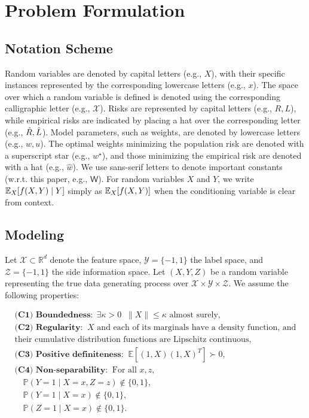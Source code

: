 


\section{Problem Formulation}

\subsection{Notation Scheme}



Random variables are denoted by capital letters (e.g., $X$), with their specific instances represented by the corresponding lowercase letters (e.g., $x$). The space over which a random variable is defined is denoted using the corresponding calligraphic letter (e.g., $\mathcal{X}$). Risks are represented by capital  letters (e.g., $R,L$), while empirical risks are indicated by placing a hat over the corresponding letter (e.g., $\hat{R}, \hat{L}$). Model parameters, such as weights, are denoted by lowercase  letters (e.g., $w,u$). The optimal weights minimizing the population risk are denoted with a superscript star (e.g., $w^\star$), and those minimizing the empirical risk are denoted with a hat (e.g., $\hat{w}$). We use sans-serif letters to denote important constants (w.r.t. this paper, e.g., $\mathsf{W}$). For random variables $X$ and $Y$, we write $\mathbb{E}_{X}[f(X,Y)\mid Y]$ simply as $\mathbb{E}_{X}[f(X,Y)]$ when the conditioning variable is clear from context.


\subsection{Modeling}
Let $\mathcal{X} \subset \mathbb{R}^d$ denote the feature space, $\mathcal{Y} = \{-1, 1\}$ the label space, and $\mathcal{Z} = \{-1, 1\}$ the side information space. Let $(X, Y, Z)$ be a random variable representing the true data generating process over $\mathcal{X} \times \mathcal{Y} \times \mathcal{Z}$. We assume the following properties:

\begin{equation} \label{eqn: distribution conditions}
\begin{array}{ll}
\textbf{(C1) Boundedness:} \ \ \exists \kappa>0  \;\; \|X\| \leq \kappa \text{ almost surely,} \\
\textbf{(C2) Regularity:} \;\; X \text{ and each of its marginals have a density function, and}\\
\text{their cumulative distribution functions are Lipschitz continuous,} \\
\textbf{(C3) Positive definiteness:} \;\; \mathbb{E}[(1,X)(1,X)^T] \succ 0, \\
\textbf{(C4) Non-separability:} \;\; \text{For all } x, z, \\
 \quad \mathbb{P}(Y = 1 \mid X = x, Z = z) \not\in \{0,1\}, \\
 \quad \mathbb{P}(Y = 1 \mid X = x) \not\in \{0,1\}, \\
 \quad \mathbb{P}(Z = 1 \mid X = x) \not\in \{0,1\}.
\end{array}
\end{equation}

